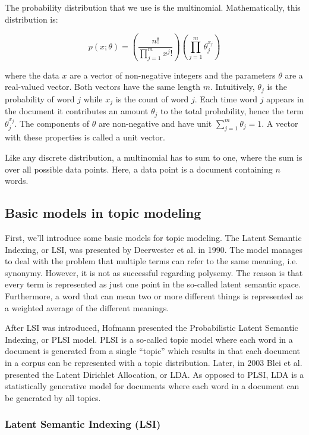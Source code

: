 \documentclass[12pt]{report}
\begin{document}
The probability distribution that we use is the multinomial. Mathematically,
this distribution is:

\begin{equation}
p(x;\theta) = \left(\frac{n!}{\prod\limits_{j=1}^m x^j!}\right)\left
(\prod\limits_{j=1}^m \theta_j^{x_j}\right)
\end{equation}

where the data $x$ are a vector of non-negative integers and the parameters
$\theta$ are a real-valued vector. Both vectors have the same length $m$.
Intuitively, $\theta_j$ is the probability of word $j$ while $x_j$ is the count
of word $j$. Each time word $j$ appears in the document it contributes an amount
$\theta_j$ to the total probability, hence the term $\theta_j^{x_j}$. The
components of $\theta$ are non-negative and have unit $\sum\limits_{j=1}^m
\theta_j = 1$. A vector with these properties is called a unit vector.

Like any discrete distribution, a multinomial has to sum to one, where the sum
is over all possible data points. Here, a data point is a document containing
$n$ words.


\subsection{Basic models in topic modeling}

First, we’ll introduce some basic models for topic modeling. The Latent Semantic
Indexing, or LSI, was presented by Deerwester et al. in 1990. The model manages
to deal with the problem that multiple terms can refer to the same meaning,
i.e. synonymy. However, it is not as successful regarding polysemy. The reason
is that every term is represented as just one point in the so-called latent
semantic space. Furthermore, a word that can mean two or more different things
is represented as a weighted average of the different meanings.
 
After LSI was introduced, Hofmann presented the Probabilistic Latent Semantic
Indexing, or PLSI model. PLSI is a so-called topic model where each word in a
document is generated from a single “topic” which results in that each document
in a corpus can be represented with a topic distribution. Later, in 2003 Blei et
al. presented the Latent Dirichlet Allocation, or LDA. As opposed to PLSI, LDA
is a statistically generative model for documents where each word in a document
can be generated by all topics.

\subsubsection{Latent Semantic Indexing (LSI)}
\end{document}
